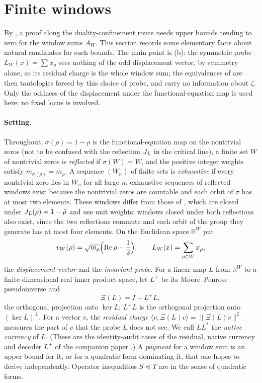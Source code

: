 \section{Finite windows}
\label{sec:finite_windows}

By , a proof along the duality-confinement
route needs upper bounds tending to zero for the window sums \(A_W\).
This section records some elementary facts about natural candidates
for such bounds.  The main point is (b):
the symmetric probe \(L_W(x)=\sum x_\rho\) sees nothing of the odd
displacement vector, by symmetry alone, so its residual charge is the
whole window sum; the equivalences of
 are then tautologies forced by this
choice of probe, and carry no information about \(\zeta\).  Only the oddness of the displacement under the
functional-equation map is used here; no fixed locus is involved.

\paragraph{Setting.}
Throughout, \(\sigma(\rho)=1-\rho\) is the functional-equation map on
the nontrivial zeros (not to be confused with the reflection \(J_{L}\) in
the critical line), a finite set \(W\) of nontrivial
zeros is \emph{reflected} if \(\sigma(W)=W\), and the positive integer
weights satisfy \(m_{\sigma(\rho)}=m_\rho\).  A sequence \((W_n)\) of
finite sets is \emph{exhaustive} if every nontrivial zero lies in
\(W_n\) for all large \(n\); exhaustive sequences of reflected windows
exist because the nontrivial zeros are countable and each orbit of
\(\sigma\) has at most two elements.  These windows differ from those of
, which are closed under
\(J_{L}(\rho)=1-\bar\rho\) and use unit weights; windows closed under both
reflections also exist, since the two reflections commute and each
orbit of the group they generate has at most four elements.  On the Euclidean
space \(\mathbb R^W\) put
\[
  v_W(\rho)=\sqrt{m_\rho}\Bigl(\operatorname{Re}\rho-\frac12\Bigr),
  \qquad
  L_W(x)=\sum_{\rho\in W}x_\rho ,
\]
the \emph{displacement vector} and the \emph{invariant probe}.  For a linear map \(L\) from \(\mathbb R^W\) to a finite-dimensional
real inner product space, let \(L^+\) be its Moore--Penrose pseudoinverse and
\[
  \Xi(L)=I-L^+L ,
\]
the orthogonal projection onto \(\ker L\); \(L^+L\) is the orthogonal
projection onto \((\ker L)^\perp\).  For a vector \(v\), the
\emph{residual charge} \(\langle v,\Xi(L)v\rangle=\|\Xi(L)v\|^2\) measures
the part of \(v\) that the probe \(L\) does not see.  We call \(LL^*\) the \emph{native currency} of \(L\).  (These are the
identity-audit cases of the residual, native currency and decoder
\(L^+\) of the companion paper \citep{TsiokosXiCompanion2026}.)  A \emph{payment} for a window sum is an upper bound for it,
or for a quadratic form dominating it, that one hopes to derive
independently.  Operator inequalities \(S\preceq T\) are in the sense of
quadratic forms.

